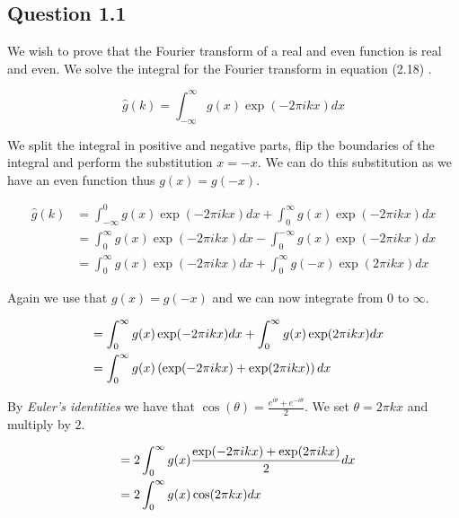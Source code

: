 \documentclass[a4paper, 10pt, final]{article}
\title{\mytitle}
\subtitle{\mysubtitle}
\author{\myauthor{} - \mymail}
\date{\mydate}
\begin{document}
\maketitle

\subsection*{Question 1.1}
We wish to prove that the Fourier transform of a real and even function
is real and even. We solve the integral for the Fourier transform in
equation (2.18) \citet[p. 44]{jahne-digital}.

\begin{equation*}
    \hat{g}(k) = \int_{-\infty}^{\infty}{g(x)\exp(-2\pi ikx)dx}
\end{equation*}

We split the integral in positive and negative parts, flip the
boundaries of the integral and perform the substitution $x = -x$. We can
do this substitution as we have an even function thus $g(x) = g(-x)$.

\begin{align*}
    \hat{g}(k) & = \int_{-\infty}^{0}{g(x)\exp(-2\pi ikx)dx} + \int_{0}^{\infty}{g(x)\exp(-2\pi ikx)dx}\\
               & = \int_{0}^{\infty}{g(x)\exp(-2\pi ikx)dx} - \int_{0}^{-\infty}{g(x)\exp(-2\pi ikx)dx}\\
               & = \int_{0}^{\infty}{g(x)\exp(-2\pi ikx)dx} + \int_{0}^{\infty}{g(-x)\exp(2\pi ikx)dx}
\end{align*}

Again we use that $g(x) = g(-x)$ and we can now integrate from
$0$ to $\infty$.

\begin{align*}
    \hspace{0.5em} &= \int_{0}^{\infty}{g(x)\exp(-2\pi ikx)dx} + \int_{0}^{\infty}{g(x)\exp(2\pi ikx)dx}\\
               & = \int_{0}^{\infty}{g(x)\left(\exp(-2\pi ikx) + \exp(2\pi ikx)\right)dx}
\end{align*}

By \emph{Euler's identities} we have that $\cos(\theta) =
\frac{e^{i\theta} + e^{-i\theta}}{2}$. We set $\theta = 2\pi kx$ and
multiply by $2$.

\begin{align*}
    \hspace{0.5em} & = 2 \int_{0}^{\infty}{g(x)\frac{\exp(-2\pi ikx) + \exp(2\pi ikx)}{2}dx}\\
               & = 2 \int_{0}^{\infty}{g(x)\cos(2\pi kx)dx}
\end{align*}
\end{document}
